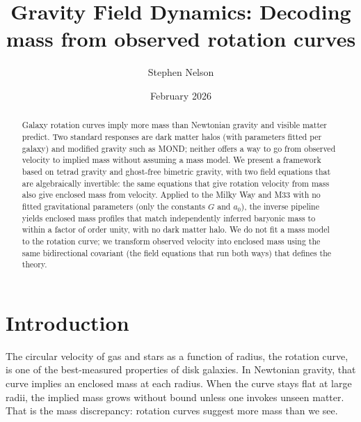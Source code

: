 \documentclass[aps,twocolumn,amsmath,amssymb,reprint,nofootinbib,nobalancelastpage]{revtex4-2}
\begin{document}
\title{Gravity Field Dynamics: Decoding mass from observed rotation curves}

\author{Stephen Nelson}

\date{February 2026}

\begin{abstract}
\vspace{1.2\baselineskip}
Galaxy rotation curves imply more mass than Newtonian gravity and visible matter predict. Two standard responses are dark matter halos (with parameters fitted per galaxy) and modified gravity such as MOND; neither offers a way to go from observed velocity to implied mass without assuming a mass model. We present a framework based on tetrad gravity and ghost-free bimetric gravity, with two field equations that are algebraically invertible: the same equations that give rotation velocity from mass also give enclosed mass from velocity. Applied to the Milky Way and M33 with no fitted gravitational parameters (only the constants $G$ and $a_0$), the inverse pipeline yields enclosed mass profiles that match independently inferred baryonic mass to within a factor of order unity, with no dark matter halo. We do not fit a mass model to the rotation curve; we transform observed velocity into enclosed mass using the same bidirectional covariant (the field equations that run both ways) that defines the theory.
\end{abstract}

\maketitle

\section{Introduction}
\label{sec:intro}

The circular velocity of gas and stars as a function of radius, the rotation curve, is one of the best-measured properties of disk galaxies. In Newtonian gravity, that curve implies an enclosed mass at each radius. When the curve stays flat at large radii, the implied mass grows without bound unless one invokes unseen matter. That is the mass discrepancy: rotation curves suggest more mass than we see.
\end{document}

